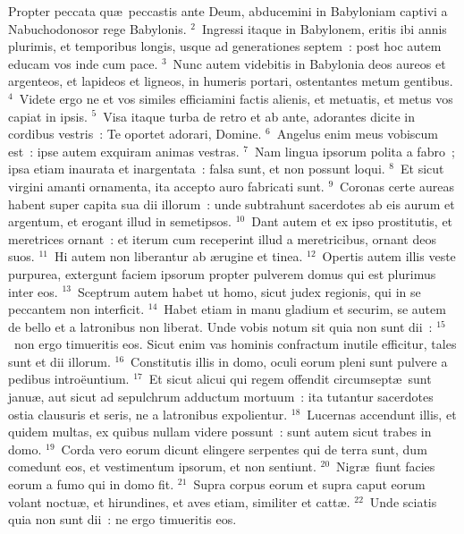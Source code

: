 \lettrine[lines=3,image=true,loversize=0.05,lraise=-0.03]{P}{}ropter peccata qu\ae\ peccastis ante Deum, abducemini in Babyloniam captivi a Nabuchodonosor rege Babylonis.
${}^{2}$~Ingressi itaque in Babylonem, eritis ibi annis plurimis, et temporibus longis, usque ad generationes septem~: post hoc autem educam vos inde cum pace.
${}^{3}$~Nunc autem videbitis in Babylonia deos aureos et argenteos, et lapideos et ligneos, in humeris portari, ostentantes metum gentibus.
${}^{4}$~Videte ergo ne et vos similes efficiamini factis alienis, et metuatis, et metus vos capiat in ipsis.
${}^{5}$~Visa itaque turba de retro et ab ante, adorantes dicite in cordibus vestris~: Te oportet adorari, Domine.
${}^{6}$~Angelus enim meus vobiscum est~: ipse autem exquiram animas vestras.
${}^{7}$~Nam lingua ipsorum polita a fabro~; ipsa etiam inaurata et inargentata~: falsa sunt, et non possunt loqui.
${}^{8}$~Et sicut virgini amanti ornamenta, ita accepto auro fabricati sunt.
${}^{9}$~Coronas certe aureas habent super capita sua dii illorum~: unde subtrahunt sacerdotes ab eis aurum et argentum, et erogant illud in semetipsos.
${}^{10}$~Dant autem et ex ipso prostitutis, et meretrices ornant~: et iterum cum receperint illud a meretricibus, ornant deos suos.
${}^{11}$~Hi autem non liberantur ab \ae rugine et tinea.
${}^{12}$~Opertis autem illis veste purpurea, extergunt faciem ipsorum propter pulverem domus qui est plurimus inter eos.
${}^{13}$~Sceptrum autem habet ut homo, sicut judex regionis, qui in se peccantem non interficit.
${}^{14}$~Habet etiam in manu gladium et securim, se autem de bello et a latronibus non liberat. Unde vobis notum sit quia non sunt dii~:
${}^{15}$~non ergo timueritis eos. Sicut enim vas hominis confractum inutile efficitur, tales sunt et dii illorum.
${}^{16}$~Constitutis illis in domo, oculi eorum pleni sunt pulvere a pedibus intro\"euntium.
${}^{17}$~Et sicut alicui qui regem offendit circumsept\ae\ sunt janu\ae , aut sicut ad sepulchrum adductum mortuum~: ita tutantur sacerdotes ostia clausuris et seris, ne a latronibus expolientur.
${}^{18}$~Lucernas accendunt illis, et quidem multas, ex quibus nullam videre possunt~: sunt autem sicut trabes in domo.
${}^{19}$~Corda vero eorum dicunt elingere serpentes qui de terra sunt, dum comedunt eos, et vestimentum ipsorum, et non sentiunt.
${}^{20}$~Nigr\ae\ fiunt facies eorum a fumo qui in domo fit.
${}^{21}$~Supra corpus eorum et supra caput eorum volant noctu\ae , et hirundines, et aves etiam, similiter et catt\ae .
${}^{22}$~Unde sciatis quia non sunt dii~: ne ergo timueritis eos.


